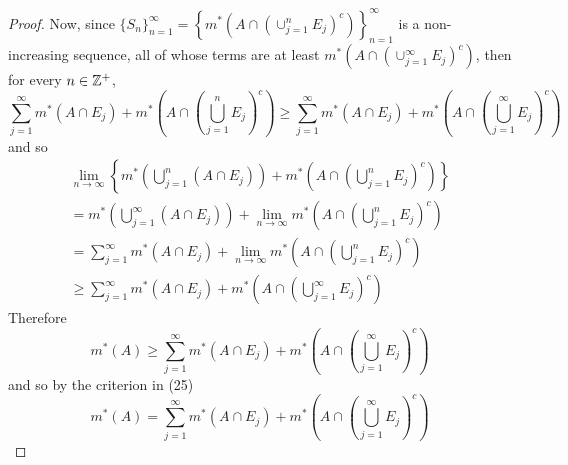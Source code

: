 \begin{pblm}
\begin{proof}
	Now, since $\{S_n\}_{n=1}^\infty = 
	\left\{m^\ast\left(A \cap \left(\cup_{j=1}^n E_j\right)^c\right)\right\}_{n=1}^\infty$ 
	is a non-increasing sequence, all of whose terms are at least 
	$m^\ast\left(A\cap\left(\cup_{j=1}^\infty E_j\right)^c\right)$, then for every $n \in \mathbb{Z}^+$, 
	\begin{equation*}
		\sum\limits_{j=1}^\infty m^\ast(A \cap E_j) + 
		m^\ast\left(A \cap \left(\bigcup\limits_{j=1}^n E_j\right)^c\right) 
		\ge 
		\sum\limits_{j=1}^\infty m^\ast(A \cap E_j) + 
		m^\ast\left(A \cap \left(\bigcup\limits_{j=1}^\infty E_j\right)^c\right)
	\end{equation*}
	and so 
	\begin{equation*}
	\begin{array}{l}
		\lim\limits_{n\to\infty} 
		\left\{
			m^\ast\left(\bigcup\limits_{j=1}^n(A\cap E_j)\right) +  
			m^\ast\left(A \cap \left(\bigcup\limits_{j=1}^n E_j\right)^c\right) 
		\right\} \\
			=  
			m^\ast\left(\bigcup\limits_{j=1}^\infty(A\cap E_j)\right) +  
			\lim\limits_{n\to\infty}
			m^\ast\left(A \cap \left(\bigcup\limits_{j=1}^n E_j\right)^c\right) \\ 
			=  
			\sum\limits_{j=1}^\infty m^\ast(A \cap E_j) + 
			\lim\limits_{n\to\infty}
			m^\ast\left(A \cap \left(\bigcup\limits_{j=1}^n E_j\right)^c\right) \\ 
			\ge  
			\sum\limits_{j=1}^\infty m^\ast(A \cap E_j) + 
			m^\ast\left(A \cap \left(\bigcup\limits_{j=1}^\infty E_j\right)^c\right)
	\end{array}
	\end{equation*}
	Therefore 
	\begin{equation*}
		m^\ast(A) \ge \sum\limits_{j=1}^\infty m^\ast(A \cap E_j) + m^\ast\left(A \cap \left(\bigcup\limits_{j=1}^\infty E_j\right)^c\right)
	\end{equation*}
	and so by the criterion in (25)
	\begin{equation*}
		m^\ast(A) = \sum\limits_{j=1}^\infty m^\ast(A \cap E_j) + m^\ast\left(A \cap \left(\bigcup\limits_{j=1}^\infty E_j\right)^c\right)
	\end{equation*}
\end{proof}
\end{pblm}

